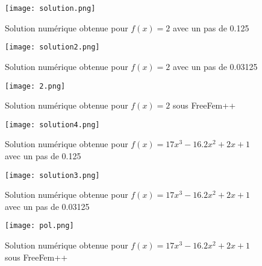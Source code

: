 \begin{figure}[h!]
\begin{center}
\texttt{[image: solution.png]}
\caption{\label{sol1}Solution numérique obtenue pour $f(x)=2$ avec un pas de 0.125}
\texttt{[image: solution2.png]}
\caption{\label{sol2}Solution numérique obtenue pour $f(x)=2$ avec un pas de 0.03125}
\texttt{[image: 2.png]}
\caption{\label{pol}Solution numérique obtenue pour $f(x)=2$ sous FreeFem++}
\end{center}
\end{figure}
\begin{figure}[h!]
\begin{center}
\texttt{[image: solution4.png]}
\caption{\label{sol3}Solution numérique obtenue pour $f(x)=17x^3-16.2x^2+2x+1$ avec un pas de 0.125}
\texttt{[image: solution3.png]}
\caption{\label{sol4}Solution numérique obtenue pour $f(x)=17x^3-16.2x^2+2x+1$ avec un pas de 0.03125}
\texttt{[image: pol.png]}
\caption{\label{polFm}Solution numérique obtenue pour $f(x)=17x^3-16.2x^2+2x+1$ sous FreeFem++}
\end{center}
\end{figure}

\clearpage 
